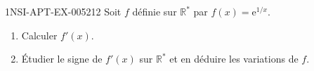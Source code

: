 \begin{exercice}{1NSI-APT-EX-005}{2}{12}
Soit $f$ définie sur $\mathbb{R}^*$ par $f(x) = \mathrm{e}^{1/x}$.
\begin{enumerate}
  \item Calculer $f'(x)$.
  \item Étudier le signe de $f'(x)$ sur $\mathbb{R}^*$ et en déduire les variations de $f$.
\end{enumerate}

\end{exercice}
